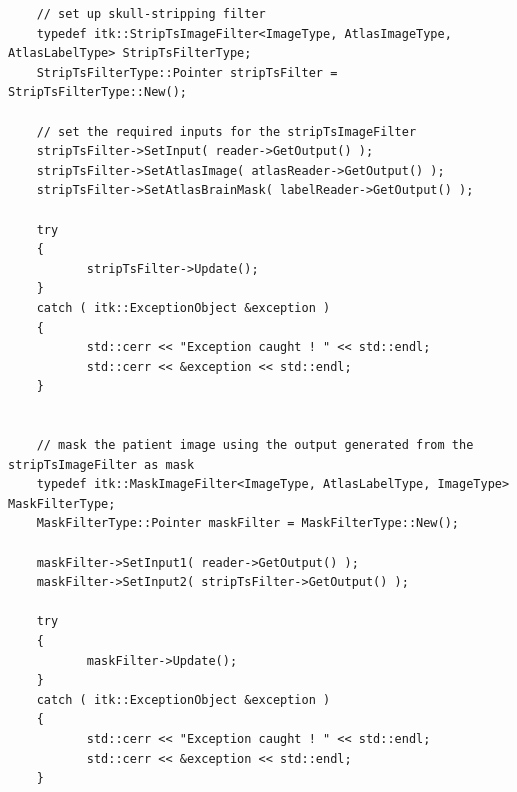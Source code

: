 \documentclass{InsightArticle}
\begin{document}
\small
\begin{verbatim}
	// set up skull-stripping filter
	typedef itk::StripTsImageFilter<ImageType, AtlasImageType, AtlasLabelType> StripTsFilterType;
	StripTsFilterType::Pointer stripTsFilter = StripTsFilterType::New();

	// set the required inputs for the stripTsImageFilter
	stripTsFilter->SetInput( reader->GetOutput() );
	stripTsFilter->SetAtlasImage( atlasReader->GetOutput() );
	stripTsFilter->SetAtlasBrainMask( labelReader->GetOutput() );

	try
	{
		   stripTsFilter->Update();
	}
	catch ( itk::ExceptionObject &exception )
	{
		   std::cerr << "Exception caught ! " << std::endl;
		   std::cerr << &exception << std::endl;
	}


	// mask the patient image using the output generated from the stripTsImageFilter as mask
	typedef itk::MaskImageFilter<ImageType, AtlasLabelType, ImageType> MaskFilterType;
	MaskFilterType::Pointer maskFilter = MaskFilterType::New();

	maskFilter->SetInput1( reader->GetOutput() );
	maskFilter->SetInput2( stripTsFilter->GetOutput() );

	try
	{
		   maskFilter->Update();
	}
	catch ( itk::ExceptionObject &exception )
	{
		   std::cerr << "Exception caught ! " << std::endl;
		   std::cerr << &exception << std::endl;
	}
\end{verbatim}
\normalsize

\newpage

%
%
%
%
%
%
%
%
\end{document}
